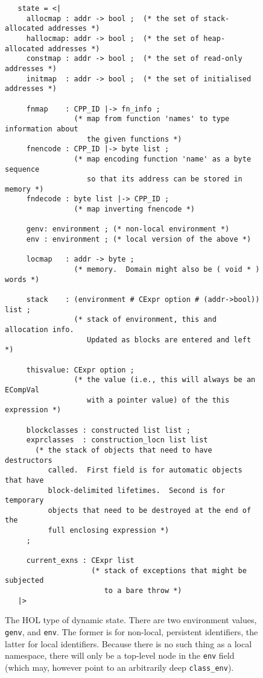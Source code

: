 \documentclass[11pt]{article}
\begin{document}
\begin{figure}[htbp]
\footnotesize
\begin{verbatim}
   state = <|
     allocmap : addr -> bool ;  (* the set of stack-allocated addresses *)
     hallocmap: addr -> bool ;  (* the set of heap-allocated addresses *)
     constmap : addr -> bool ;  (* the set of read-only addresses *)
     initmap  : addr -> bool ;  (* the set of initialised addresses *)

     fnmap    : CPP_ID |-> fn_info ;
                (* map from function 'names' to type information about
                   the given functions *)
     fnencode : CPP_ID |-> byte list ;
                (* map encoding function 'name' as a byte sequence
                   so that its address can be stored in memory *)
     fndecode : byte list |-> CPP_ID ;
                (* map inverting fnencode *)

     genv: environment ; (* non-local environment *)
     env : environment ; (* local version of the above *)

     locmap   : addr -> byte ;
                (* memory.  Domain might also be ( void * ) words *)

     stack    : (environment # CExpr option # (addr->bool)) list ;
                (* stack of environment, this and allocation info.
                   Updated as blocks are entered and left *)

     thisvalue: CExpr option ;
                (* the value (i.e., this will always be an ECompVal
                   with a pointer value) of the this expression *)

     blockclasses : constructed list list ;
     exprclasses  : construction_locn list list
       (* the stack of objects that need to have destructors
          called.  First field is for automatic objects that have
          block-delimited lifetimes.  Second is for temporary
          objects that need to be destroyed at the end of the
          full enclosing expression *)
     ;

     current_exns : CExpr list
                    (* stack of exceptions that might be subjected
                       to a bare throw *)
   |>
\end{verbatim}
\caption[The HOL Type of Dynamic State]{The HOL type of dynamic state.
  There are two environment values, \texttt{genv}, and \texttt{env}.
  The former is for non-local, persistent identifiers, the latter for
  local identifiers.  Because there is no such thing as a local
  namespace, there will only be a top-level node in the \texttt{env}
  field (which may, however point to an arbitrarily deep
  \texttt{class_env}).}
\label{fig:state-type}
\end{figure}
\end{document}
